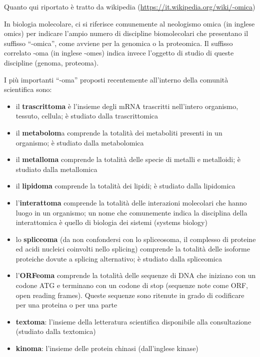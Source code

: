 \documentclass[a4paper,12pt, oneside]{book}
\begin{document}
\begin{shaded}
  Quanto qui riportato è tratto da wikipedia
  (\url{https://it.wikipedia.org/wiki/-omica}) 
  \begin{definizione}
    In biologia molecolare, ci si riferisce comunemente al neologismo omica (in
    inglese omics) per indicare l'ampio numero di discipline biomolecolari che
    presentano il suffisso ``-omica'', come avviene per la genomica o la
    proteomica. Il suffisso correlato -oma (in inglese -omes) indica invece
    l'oggetto di studio di queste discipline (genoma, proteoma).  
  \end{definizione}
  I più importanti ``-oma'' proposti recentemente all'interno della comunità
  scientifica sono:
  \begin{itemize}
    \item il \textbf{trascrittoma} è l'insieme degli mRNA trascritti nell'intero
    organismo, tessuto, cellula; è studiato dalla trascrittomica
    \item il \textbf{metabolom}a comprende la totalità dei metaboliti presenti
    in un organismo; è studiato dalla metabolomica 
    \item il \textbf{metalloma} comprende la totalità delle specie di metalli e
    metalloidi; è studiato dalla metallomica 
    \item il \textbf{lipidoma} comprende la totalità dei lipidi; è studiato dalla
    lipidomica 
    \item l'\textbf{interattoma} comprende la totalità delle interazioni
    molecolari che hanno luogo in un organismo; un nome che comunemente indica
    la disciplina 
    della interattomica è quello di biologia dei sistemi (systems biology)
    \item lo \textbf{spliceoma} (da non confondersi con lo spliceosoma, il
    complesso di 
    proteine ed acidi nucleici coinvolti nello splicing) comprende la totalità
    delle isoforme proteiche dovute a splicing alternativo; è studiato dalla
    spliceomica
    \item l'\textbf{ORFeoma} comprende la totalità delle sequenze di DNA che
    iniziano con 
    un codone ATG e terminano con un codone di stop (sequenze note come ORF,
    open reading frames). Queste sequenze sono ritenute in grado di codificare
    per una proteina o per una parte
    \item \textbf{textoma}: l'insieme della letteratura scientifica disponibile
    alla consultazione (studiato dalla textomica)
    \item \textbf{kinoma}: l'insieme delle protein chinasi (dall'inglese kinase)

\end{itemize}
\end{shaded}
\end{document}
